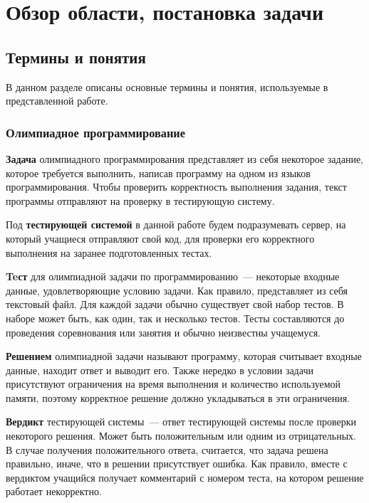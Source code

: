 \chapter{Обзор области, постановка задачи}

\section{Термины и понятия}

В данном разделе описаны основные термины и понятия, используемые в представленной работе.

\subsection{Олимпиадное программирование}

\textbf{Задача} олимпиадного программирования представляет из себя некоторое задание, которое требуется выполнить, написав
программу на одном из языков программирования. Чтобы проверить корректность выполнения задания, текст программы
отправляют на проверку в тестирующую систему.

Под \textbf{тестирующей системой} в данной работе будем подразумевать сервер, на который учащиеся отправляют свой код, 
для проверки его корректного выполнения на заранее подготовленных тестах.

\textbf{Teст} для олимпиадной задачи по программированию~--- некоторые входные данные, удовлетворяющие условию задачи.
Как правило, представляет из себя текстовый файл. Для каждой задачи обычно существует свой набор тестов. В наборе может быть,
как один, так и несколько тестов. Тесты составляются до проведения соревнования или занятия и обычно неизвестны учащемуся.

\textbf{Решением} олимпиадной задачи называют программу, которая считывает входные данные, находит ответ и выводит его.
Также нередко в условии задачи присутствуют ограничения на время выполнения и количество используемой памяти, поэтому
корректное решение должно укладываться в эти ограничения.

\textbf{Вердикт} тестирующей системы~--- ответ тестирующей системы после проверки некоторого решения. 
Может быть положительным или одним из отрицательных. 
В случае получения положительного ответа, считается, что задача решена правильно, иначе, что в решении присутствует ошибка.
Как правило, вместе с вердиктом учащийся получает комментарий с номером теста, на котором решение работает некорректно.

